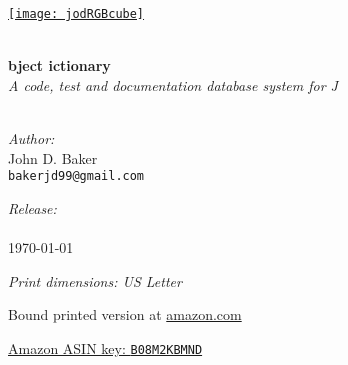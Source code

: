\begin{titlepage}
 
\begin{center}
 
 
\href{https://bakerjd99.wordpress.com/the-jod-page/}{\texttt{[image: jodRGBcube]}} 
 
\HRule \\[0.8cm]

{ \Huge \bfseries {} bject ictionary}\\[0.4cm]

\textsl{A code, test and documentation database system for J}\\[0.4cm]
 
\HRule \\[0.8cm]
 
 
\begin{minipage}{0.4\textwidth}
\begin{flushleft}
\emph{Author:}\\
John D. Baker \\
\texttt{bakerjd99@gmail.com} \\
\end{flushleft}
\end{minipage}
\begin{minipage}{0.4\textwidth}
\begin{flushright}
\emph{Release:}\\
\jodversion \\
\today \\
\end{flushright}
\end{minipage}

\vspace{0.8cm}

\emph{Print dimensions: US Letter}

Bound printed version at \href{https://www.amazon.com/dp/B08M2KBMND}{amazon.com} 

\href{https://www.amazon.com/dp/B08M2KBMND}{Amazon ASIN key: \texttt{B08M2KBMND}}


\end{center}
\end{titlepage}
